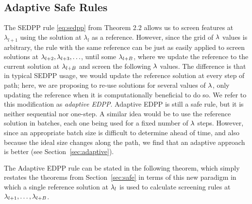 \subsection{Adaptive Safe Rules}
\label{sec:asr}

The SEDPP rule \eqref{eq:sedpp} from Theorem 2.2 allows us to screen features at $\lambda_{l+1}$ using the solution at $\lambda_l$ as a reference. However, since the grid of $\lambda$ values is arbitrary, the rule with the same reference can be just as easily applied to screen solutions at $\lambda_{l+2}, \lambda_{l+3}, \ldots$, until some $\lambda_{l+B}$, where we update the reference to the current solution at $\lambda_{l+B}$ and screen the following $\lambda$ values.  The difference is that in typical SEDPP usage, we would update the reference solution at every step of path; here, we are proposing to re-use solutions for several values of $\lambda$, only updating the reference when it is computationally beneficial to do so.  We refer to this modification as \emph{adaptive EDPP}.  Adaptive EDPP is still a safe rule, but it is neither sequential nor one-step.   A similar idea would be to use the reference solution in batches, each one being used for a fixed number of $\lambda$ steps.  However, since an appropriate batch size is difficult to determine ahead of time, and also because the ideal size changes along the path, we find that an adaptive approach is better (see Section~\ref{sec:adaptive}).

The Adaptive EDPP rule can be stated in the following theorem, which simply restates the theorems from Section~\ref{sec:safe} in terms of this new paradigm in which a single reference solution at $\lambda_l$ is used to calculate screening rules at $\lambda_{l+1}, \ldots, \lambda_{l+B}$.

